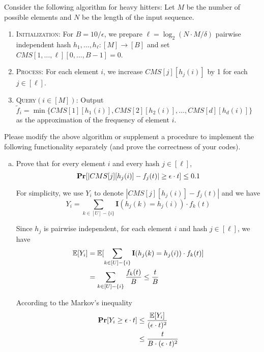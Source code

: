 \begin{problem}[40 points]
    Consider the following algorithm for heavy hitters: Let $M$ be the number of possible elements and $N$ be the length of the input sequence.
    \begin{enumerate}
        \item \textsc{Initialization}: For $B = 10/\epsilon$, we prepare $\ell = \log_2(N \cdot M/\delta )$ pairwise independent hash $h_1 , \dots , h_\ell : [M] \rightarrow [B]$ and set $CMS[1, \dots , \ell][0, \dots , B-1] = 0$.
        \item \textsc{Process}: For each element $i$, we increase $CMS[j][h_j(i)]$ by 1 for each $j \in [\ell]$.
        \item \textsc{Query}$(i \in [M])$: Output $\widetilde{f}_i = \min\{CMS[1][h_1(i)],CMS[2][h_2(i)],\dots,CMS[d][h_d(i)]\}$ as the approximation of the frequency of element $i$.
    \end{enumerate}
    Please modify the above algorithm or supplement a procedure to implement the following functionality separately (and prove the correctness of your codes).

    \begin{enumerate}[(a)] 
        \item Prove that for every element $i$ and every hash $j \in [\ell]$,
        \begin{equation}
            \notag \mathbf{Pr}[|CMS[j][h_j(i)]-f_j(t)| \geq \epsilon \cdot t] \leq 0.1
        \end{equation}

        \Answer
        For simplicity, we use $Y_i$ to denote $|CMS[j][h_j(i)]-f_j(t)|$ and we have
        \begin{equation}
            Y_i = \sum_{k \in [U]-\{i\}}  \mathbf{I}(h_j(k)=h_j(i)) \cdot f_k(t)
        \end{equation}

        Since $h_j$ is pairwise independent, for each element $i$ and hash  $j \in [\ell]$, we have
        \begin{align}
            \notag \operatorname*{\mathbb{E}}[Y_i]&=\operatorname*{\mathbb{E}}[ \sum_{k \in [U]-\{i\}}  \mathbf{I}(h_j(k)=h_j(i)) \cdot f_k(t)] \\
            & =   \sum_{k \in [U]-\{i\}} \frac{f_k(t)}{B} \leq \frac{t}{B}
        \end{align}
        
        According to the Markov's inequality
        \begin{align}
            \notag\mathbf{Pr}[Y_i \geq \epsilon \cdot t] &\leq \frac{\operatorname*{\mathbb{E}}[Y_i]}{(\epsilon \cdot t)^2} \\
            & \leq  \frac{t}{B\cdot (\epsilon \cdot t)^2} 
        \end{align}


\end{enumerate}
\end{problem}
